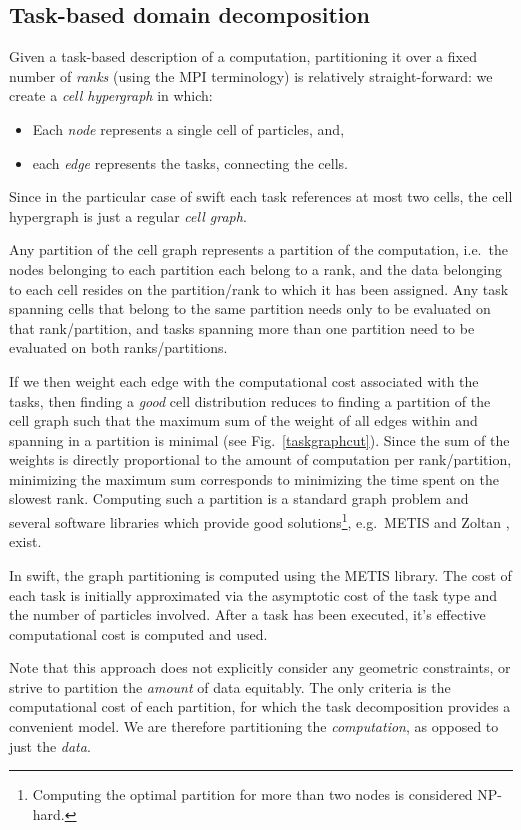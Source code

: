 \documentclass{sig-alternate-05-2015}
\newcommand{\swift}{{\sc swift}\xspace}
\begin{document}
\subsection{Task-based domain decomposition}

Given a task-based description of a computation, partitioning it over
a fixed number of {\em ranks} (using the MPI terminology)
is relatively straight-forward: we create
a {\em cell hypergraph} in which:
\begin{itemize}
  \item Each {\em node} represents a single cell of particles, and,
  \item each {\em edge} represents the tasks, connecting the
    cells.
\end{itemize}
Since in the particular case of \swift each task references at most
two cells, the cell hypergraph is just a regular {\em cell graph}.

Any partition of the cell graph represents a partition of the
computation, i.e.~the nodes belonging to each partition each belong
to a rank, and the
data belonging to each cell resides on the partition/rank to which
it has been assigned.
Any task spanning cells that belong to the same partition needs only
to be evaluated on that rank/partition, and tasks spanning more than
one partition need to be evaluated on both ranks/partitions.

If we then weight each edge with the computational cost associated with
the tasks, then finding a {\em good} cell distribution reduces to finding a
partition of the cell graph such that the maximum sum of the weight
of all edges within and spanning in a partition is minimal
(see Fig.~\ref{taskgraphcut}).
Since the sum of the weights is directly proportional to the amount
of computation per rank/partition, minimizing the maximum sum
corresponds to minimizing the time spent on the slowest rank.
Computing such a partition is a standard graph problem and several
software libraries which provide good solutions\footnote{Computing
the optimal partition for more than two nodes is considered NP-hard.},
e.g.~METIS \cite{ref:Karypis1998} and Zoltan \cite{devine2002zoltan}, exist.

In \swift, the graph partitioning is computed using the METIS library.
The cost of each task is initially approximated via the
asymptotic cost of the task type and the number of particles involved.
After a task has been executed, it's effective computational cost
is computed and used.

Note that this approach does not explicitly consider any geometric
constraints, or strive to partition the {\em amount} of data equitably.
The only criteria is the computational cost of each partition, for
which the task decomposition provides a convenient model.
We are therefore partitioning the {\em computation}, as opposed
to just the {\em data}.
\end{document}
